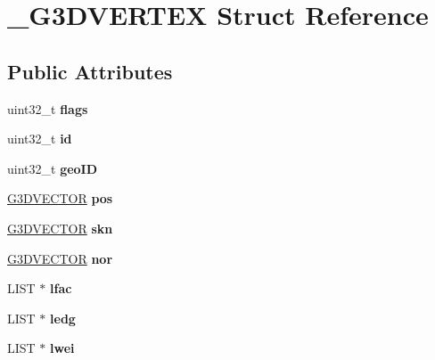 \hypertarget{struct__G3DVERTEX}{}\section{\+\_\+\+G3\+D\+V\+E\+R\+T\+EX Struct Reference}
\label{struct__G3DVERTEX}
\subsection*{Public Attributes}
\begin{DoxyCompactItemize}
\item 
\mbox{\label{struct__G3DVERTEX_a516df262e47e5e2e16a25adc91cbb263}} 
uint32\+\_\+t {\bfseries flags}
\item 
\mbox{\label{struct__G3DVERTEX_a5a786c47a2603b5737a620012f33de37}} 
uint32\+\_\+t {\bfseries id}
\item 
\mbox{\label{struct__G3DVERTEX_aab786b0fc1b11fd97f7991d2a37c9bb5}} 
uint32\+\_\+t {\bfseries geo\+ID}
\item 
\mbox{\label{struct__G3DVERTEX_af140cffb7fb2e5c259d87125422c45c3}} 
\hyperlink{struct__G3DVECTOR}{G3\+D\+V\+E\+C\+T\+OR} {\bfseries pos}
\item 
\mbox{\label{struct__G3DVERTEX_ac4e5b321819929ab06f675a90496204b}} 
\hyperlink{struct__G3DVECTOR}{G3\+D\+V\+E\+C\+T\+OR} {\bfseries skn}
\item 
\mbox{\label{struct__G3DVERTEX_ae991d8a4b95bcfd08eb9cda1cc8f8aa1}} 
\hyperlink{struct__G3DVECTOR}{G3\+D\+V\+E\+C\+T\+OR} {\bfseries nor}
\item 
\mbox{\label{struct__G3DVERTEX_a3018a6aeb70c6ac12a52a0dbb5094d67}} 
L\+I\+ST $\ast$ {\bfseries lfac}
\item 
\mbox{\label{struct__G3DVERTEX_a16cfead1dfdbe10891929971ed845762}} 
L\+I\+ST $\ast$ {\bfseries ledg}
\item 
\mbox{\label{struct__G3DVERTEX_af5e6208bfb2b69e7ca3049f05103f1a5}} 
L\+I\+ST $\ast$ {\bfseries lwei}

\end{DoxyCompactItemize}
